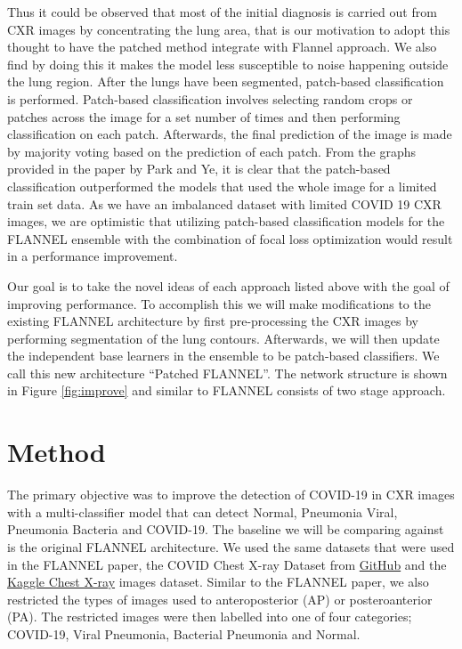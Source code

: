 \documentclass{sigkddExp}
\begin{document}
Thus it could be observed that most of the initial diagnosis is carried out from
CXR images by concentrating the lung area, that is our motivation to adopt this
thought to have the patched method integrate with Flannel approach. We also find
by doing this it makes the model less susceptible to noise happening outside the
lung region. After the lungs have been segmented, patch-based classification is
performed. Patch-based classification involves selecting random crops or patches
across the image for a set number of times and then performing classification on
each patch. Afterwards, the final prediction of the image is made by majority
voting based on the prediction of each patch. From the graphs provided in the
paper \cite{pmid32396075} by Park and Ye, it is clear that the patch-based
classification outperformed the models that used the whole image for a limited
train set data. As we have an imbalanced dataset with limited COVID 19 CXR
images, we are optimistic that utilizing patch-based classification models for
the FLANNEL ensemble with the combination of focal loss optimization would
result in a performance improvement.

Our goal is to take the novel ideas of each approach listed above with the goal
of improving performance. To accomplish this we will make modifications to the
existing FLANNEL architecture by first pre-processing the CXR images by
performing segmentation of the lung contours. Afterwards, we will then update
the independent base learners in the ensemble to be patch-based classifiers. We
call this new architecture “Patched FLANNEL”. The network structure is shown in
Figure \ref{fig:improve} and similar to FLANNEL consists of two stage approach.


\section{Method}

The primary objective was to improve the detection of COVID-19 in CXR images
with a multi-classifier model that can detect Normal, Pneumonia Viral, Pneumonia
Bacteria and COVID-19. The baseline we will be comparing against is the original
FLANNEL architecture. We used the same datasets that were used in the FLANNEL
paper, the COVID Chest X-ray Dataset \cite{cohen2020covidProspective} from
\href{https://github.com/ieee8023/covid-chestxray-dataset}{GitHub} and the
\href{https://www.kaggle.com/paultimothymooney/chest-xray-pneumonia}{Kaggle
    Chest X-ray} images dataset. Similar to the FLANNEL paper, we also restricted
the types of images used to anteroposterior (AP) or posteroanterior (PA). The
restricted images were then labelled into one of four categories; COVID-19,
Viral Pneumonia, Bacterial Pneumonia and Normal.
\end{document}
